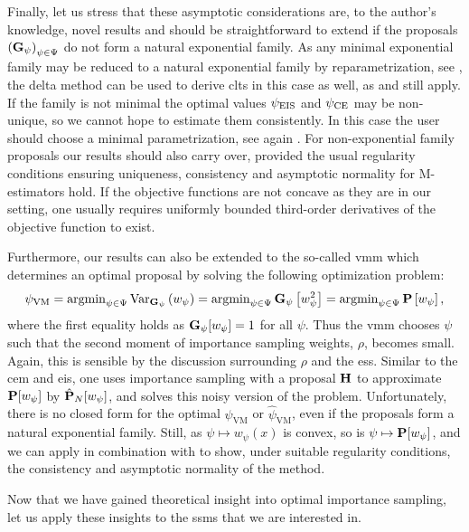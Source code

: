 Finally, let us stress that these asymptotic considerations are, to the author's knowledge, novel results and should be straightforward to extend if the proposals $\left(\G_{\psi}\right)_{\psi \in \Psi}$ do not form a natural exponential family. As any minimal exponential family may be reduced to a natural exponential family by reparametrization, see \citep[Theorem 1.9]{Brown1986Fundamentals}, the delta method can be used to derive \glspl{clt} in this case as well, as  and  still apply. If the family is not minimal the optimal values $\peis$ and $\pce$ may be non-unique, so we cannot hope to estimate them consistently. In this case the user should choose a minimal parametrization, see again \citep[Theorem 1.9]{Brown1986Fundamentals}. 
For non-exponential family proposals our results should also carry over, provided the usual regularity conditions ensuring uniqueness, consistency and asymptotic normality for M-estimators hold. If the objective functions are not concave as they are in our setting, one usually requires uniformly bounded third-order derivatives of the objective function to exist. 

Furthermore, our results can also be extended to the so-called \gls{vmm} which determines an optimal proposal by solving the following optimization problem:
$$
\psi_{\text{VM}} = \argmin_{\psi\in\Psi} \var_{\G_{\psi}} \left( w_{\psi}  \right) = \argmin_{\psi \in \Psi} \G_{\psi} \left[w_{\psi}^2\right] = \argmin_{\psi\in\Psi} \P \left[w_{\psi} \right],
$$
where the first equality holds as $\G_{\psi}[w_{\psi}] = 1$ for all $\psi$. Thus the \gls{vmm} chooses $\psi$ such that the second moment of importance sampling weights, $\rho$, becomes small. Again, this is sensible by the discussion surrounding $\rho$ and the \gls{ess}. Similar to the \gls{cem} and \gls{eis}, one uses importance sampling with a proposal $\H$ to approximate $\P [w_{\psi}]$ by $\hat\P_{N} [w_{\psi}]$, and solves this noisy version of the problem.
Unfortunately, there is no closed form for the optimal $\psi_{\text{VM}}$ or $\hat\psi_{\text{VM}}$, even if the proposals form a natural exponential family. Still, as $\psi \mapsto w_{\psi}(x)$ is convex, so is $\psi \mapsto \P [w_{\psi}]$, and we can apply  in combination with  to show, under suitable regularity conditions, the consistency and asymptotic normality of the method. 

Now that we have gained theoretical insight into optimal importance sampling, let us apply these insights to the \glspl{ssm} that we are interested in.

